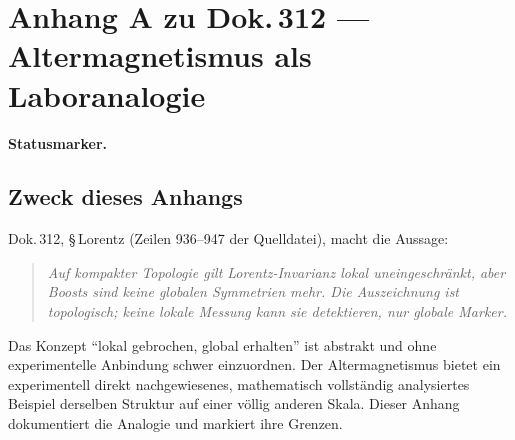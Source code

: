 
\providecommand{\B}{}\renewcommand{\B}{\textbf{[B]}}
\providecommand{\K}{}\renewcommand{\K}{\textbf{[K]}}
\providecommand{\E}{}\renewcommand{\E}{\textbf{[E]}}
\providecommand{\SET}{}\renewcommand{\SET}{\textbf{[SETZUNG]}}


\chapter*{Anhang A zu Dok.\,312 — Altermagnetismus als Laboranalogie}

\medskip\noindent\textbf{Statusmarker.}


\section*{Zweck dieses Anhangs}

Dok.\,312, §\,Lorentz (Zeilen 936--947 der Quelldatei), macht die Aussage:

\begin{quote}
\itshape
Auf kompakter Topologie gilt Lorentz-Invarianz lokal uneingeschränkt,
aber Boosts sind keine globalen Symmetrien mehr.
Die Auszeichnung ist topologisch; keine lokale Messung kann sie
detektieren, nur globale Marker.
\end{quote}

Das Konzept \enquote{lokal gebrochen, global erhalten} ist abstrakt und ohne
experimentelle Anbindung schwer einzuordnen. Der Altermagnetismus
bietet ein experimentell direkt nachgewiesenes, mathematisch
vollständig analysiertes Beispiel derselben Struktur auf einer
völlig anderen Skala. Dieser Anhang dokumentiert die Analogie
und markiert ihre Grenzen.

